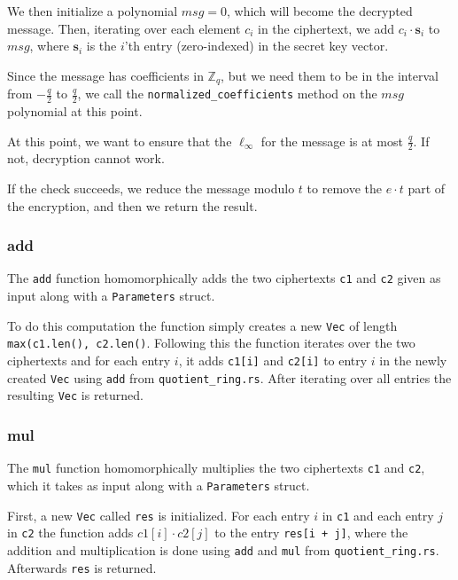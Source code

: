 \documentclass[../main.tex]{subfiles}
\begin{document}
We then initialize a polynomial $msg = 0$, which will become the decrypted message.
Then, iterating over each element $c_i$ in the ciphertext, we add $c_i \cdot \mathbf{s}_i$ to $msg$, where $\mathbf{s}_i$ is the $i$'th entry (zero-indexed) in the secret key vector.

Since the message has coefficients in $\mathbb{Z}_q$, but we need them to be in the interval from $-\frac{q}{2}$ to $\frac{q}{2}$, we call the \lstinline{normalized_coefficients} method on the $msg$ polynomial at this point.

At this point, we want to ensure that the $\ell_\infty$ for the message is at most $\frac{q}{2}$. If not, decryption cannot work.

If the check succeeds, we reduce the message modulo $t$ to remove the $e \cdot t$ part of the encryption, and then we return the result.

\subsubsection{add}
The \lstinline{add} function homomorphically adds the two ciphertexts \lstinline{c1} and \lstinline{c2} given as input along with a \lstinline{Parameters} struct.

To do this computation the function simply creates a new \lstinline{Vec} of length \lstinline{max(c1.len(), c2.len()}. Following this the function iterates over the two ciphertexts and for each entry $i$, it adds \lstinline{c1[i]} and \lstinline{c2[i]} to entry $i$ in the newly created \lstinline{Vec} using \lstinline{add} from \lstinline{quotient_ring.rs}. After iterating over all entries the resulting \lstinline{Vec} is returned.

\subsubsection{mul}
The \lstinline{mul} function homomorphically multiplies the two ciphertexts \lstinline{c1} and \lstinline{c2}, which it takes as input along with a \lstinline{Parameters} struct.

First, a new \lstinline{Vec} called \lstinline{res} is initialized.
For each entry $i$ in \lstinline{c1} and each entry $j$ in \lstinline{c2} the function adds $c1[i] \cdot c2[j]$ to the entry \lstinline{res[i + j]}, where the addition and multiplication is done using \lstinline{add} and \lstinline{mul} from \lstinline{quotient_ring.rs}.
Afterwards \lstinline{res} is returned.
\end{document}
